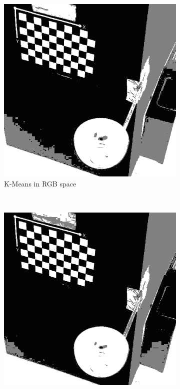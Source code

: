 \documentclass[10pt,twocolumn,letterpaper]{article}
\begin{document}
\begin{figure}
    \centering
    \begin{subfigure}[t]{0.2\textwidth}
        \centering
        \includegraphics[width=\textwidth]{cluster_ids_RGB.png}
        \caption{K-Means in RGB space}
    \end{subfigure}
    ~ 
    \begin{subfigure}[t]{0.2\textwidth}
        \centering
        \includegraphics[width=\textwidth]{cluster_ids_full-lab.png}

\end{subfigure}
\end{figure}
\end{document}
